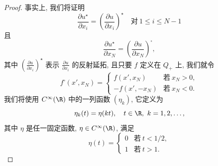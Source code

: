 \begin{proof}
事实上, 我们将证明
\begin{equation}
\frac{\partial u^\star}{\partial x_i}
=\left(\frac{\partial u}{\partial x_i}\right)^\star
\quad\text{对}\ 1\le i\le N-1
\label{eq:9.7}
\end{equation}
且
\begin{equation}
\frac{\partial u^\star}{\partial x_N}
=\left(\frac{\partial u}{\partial x_N}\right)^{\square},
\label{eq:9.8}
\end{equation}
其中 $(\frac{\partial u}{\partial x_i})^\star$ 表示 $\frac{\partial u}
{\partial x_i}$ 的反射延拓, 且只要 $f$ 定义在 $Q_+$ 上, 我们就令
\begin{equation*}
f^{\square}(x',x_N)=
\begin{cases}
f(x',x_N) & \text{若}\ x_N>0,\\
-f(x',-x_N) & \text{若}\ x_N<0.
\end{cases}
\end{equation*}
我们将使用 $C^\infty(\R)$ 中的一列函数 $(\eta_k)$, 它定义为
\begin{equation*}
\eta_k(t)=\eta(kt),\quad t\in\R,\ k=1,2,\dots,
\end{equation*}
其中 $\eta$ 是任一固定函数, $\eta\in C^\infty(\R)$, 满足
\begin{equation*}
\eta(t)=
\begin{cases}
0 & \text{若}\ t<1/2,\\
1 & \text{若}\ t>1.
\end{cases}
\end{equation*}


\end{proof}
